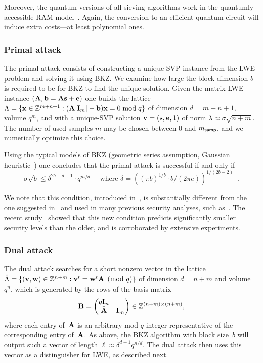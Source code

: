 Moreover, the quantum versions of all sieving algorithms work in the
quantumly accessible RAM model~\cite{LMP15}. Again, the conversion to
an efficient quantum circuit will induce extra costs---at least
polynomial ones.

\subsubsection{Primal attack}

The primal attack consists of constructing a unique-SVP instance from
the LWE problem and solving it using BKZ. We examine how large the
block dimension $b$ is required to be for BKZ to find the unique
solution. Given the matrix LWE instance
$( \mathbf{A},\mathbf{b} = \mathbf{A} \mathbf{s} + \mathbf{e})$ one builds the lattice
$\Lambda = \{ \mathbf{x} \in \mathbb Z^{m+n+1} : ( \mathbf{A} | \mathbf{I}_m | - \mathbf{b})
\mathbf{x} = 0 \bmod q \}$ of dimension $d = m + n + 1$, volume $q^m$, and
with a unique-SVP solution $\mathbf{v} = (\mathbf{s}, \mathbf{e}, 1 )$ of norm
$\lambda \approx \sigma \sqrt{n+m}$. The number of used samples $m$
may be chosen between $0$ and $m_{\mathsf{samp}}$, and we numerically optimize
this choice.

Using the typical models of BKZ (geometric series assumption, Gaussian
heuristic~\cite{ChenThesis,albrecht15:_concrete_lwe}) one concludes
that the primal attack is successful if and only if
\begin{equation}
  \label{eqn:primal_attack_cond}
  \sigma \sqrt b \leq \delta^{2b-d -1} \cdot q^{m/d} \quad \text{ where } \delta = ((\pi b)^{1/b} \cdot b/(2\pi e))^{1/(2b-2)} \enspace .
\end{equation}

We note that this condition, introduced in~\cite{USENIX:ADPS16}, is
substantially different from the one suggested in~\cite{EC:GamNgu08}
and used in many previous security analyses, such
as~\cite{albrecht15:_concrete_lwe}. The recent study~\cite{AC:AGVW17}
showed that this new condition predicts significantly smaller security
levels than the older, and is corroborated by extensive experiments.

\subsubsection{Dual attack}
\label{sec:dual-attack}

The dual attack searches for a short nonzero vector in the lattice
$\hat \Lambda = \{ (\mathbf{v}, \mathbf{w}) \in \mathbb{Z}^{n + m} : \mathbf{v}^{t} =
\mathbf{w}^{t} \mathbf{A} \pmod q\}$ of dimension $d=n+m$ and volume~$q^{n}$,
which is generated by the rows of the basis matrix
\[ \mathbf{B} =
  \begin{pmatrix}
    q \mathbf{I}_{n} & \\ \bar {\mathbf{A}} & \mathbf{I}_{m}
  \end{pmatrix}  \in \mathbb{Z}^{(n+m) \times (n+m)} ,
\]
where each entry of~$\bar {\mathbf{A}}$ is an arbitrary mod-$q$ integer
representative of the corresponding entry of~$\mathbf{A}$.  As above, the
BKZ algorithm with block size~$b$ will output such a vector of length
$\ell \approx \delta^{d-1} q^{n/d}$. The dual attack then uses this
vector as a distinguisher for LWE, as described next.

